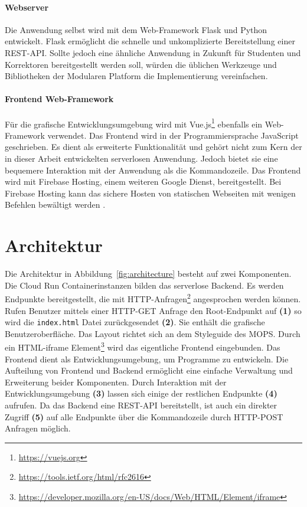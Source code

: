 \paragraph{Webserver} Die Anwendung selbst wird mit dem Web-Framework
Flask \cite{Flask}
und Python entwickelt. Flask ermöglicht die schnelle und
unkomplizierte Bereitstellung einer REST-API. Sollte jedoch eine ähnliche Anwendung in Zukunft
für Studenten und Korrektoren bereitgestellt werden soll, würden die üblichen Werkzeuge und
Bibliotheken der Modularen Platform die Implementierung vereinfachen.

\paragraph{Frontend Web-Framework} Für die grafische Entwicklungsumgebung
wird mit Vue.js\footnote{\url{https://vuejs.org}} ebenfalls ein Web-Framework verwendet.
Das Frontend wird in der Programmiersprache JavaScript geschrieben. Es dient als
erweiterte Funktionalität und gehört nicht zum Kern der in dieser Arbeit entwickelten
serverlosen Anwendung. Jedoch bietet sie eine bequemere Interaktion mit der Anwendung als
die Kommandozeile. Das Frontend wird mit
Firebase Hosting, einem weiteren Google Dienst,
bereitgestellt. Bei Firebase Hosting kann das sichere Hosten von statischen Webseiten
mit wenigen Befehlen bewältigt werden \cite{FirebaseHosting}.

\section{Architektur}
Die Architektur in Abbildung~\ref{fig:architecture} besteht auf zwei
Komponenten.
Die Cloud Run Containerinstanzen bilden das serverlose Backend.
Es werden Endpunkte bereitgestellt, die mit
HTTP-Anfragen\footnote{\url{https://tools.ietf.org/html/rfc2616}}
angesprochen werden können. Rufen Benutzer
mittels einer HTTP-GET Anfrage den
Root-Endpunkt auf \textbf{(1)} so wird
die \texttt{index.html} Datei zurückgesendet \textbf{(2)}.
Sie enthält die grafische Benutzeroberfläche. Das Layout richtet
sich an dem Styleguide des MOPS. Durch ein
HTML-iframe Element\footnote{\url{https://developer.mozilla.org/en-US/docs/Web/HTML/Element/iframe}}
wird das eigentliche Frontend eingebunden. Das Frontend dient als Entwicklungsumgebung, um Programme
zu entwickeln. Die Aufteilung von Frontend und Backend
ermöglicht eine einfache Verwaltung und Erweiterung beider Komponenten.
Durch Interaktion mit der Entwicklungsumgebung \textbf{(3)} lassen sich einige
der restlichen Endpunkte \textbf{(4)} aufrufen. 
Da das Backend eine REST-API bereitstellt, ist auch ein direkter Zugriff \textbf{(5)} auf alle 
Endpunkte über die Kommandozeile durch HTTP-POST Anfragen möglich.

